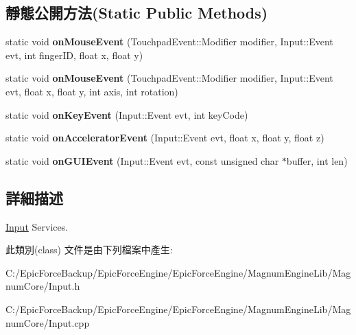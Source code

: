 \subsection*{靜態公開方法(Static Public Methods)}
\begin{DoxyCompactItemize}
\item 
static void {\bfseries on\+Mouse\+Event} (Touchpad\+Event\+::\+Modifier modifier, Input\+::\+Event evt, int finger\+ID, float x, float y)\hypertarget{class_magnum_1_1_input_a9e4984faa8e4443e49d73155830deb25}{}\label{class_magnum_1_1_input_a9e4984faa8e4443e49d73155830deb25}

\item 
static void {\bfseries on\+Mouse\+Event} (Touchpad\+Event\+::\+Modifier modifier, Input\+::\+Event evt, float x, float y, int axis, int rotation)\hypertarget{class_magnum_1_1_input_a640a6e0f9b0bf1df5f82d277516369ab}{}\label{class_magnum_1_1_input_a640a6e0f9b0bf1df5f82d277516369ab}

\item 
static void {\bfseries on\+Key\+Event} (Input\+::\+Event evt, int key\+Code)\hypertarget{class_magnum_1_1_input_a76cc21a9ef286a6d45852b76198b48d5}{}\label{class_magnum_1_1_input_a76cc21a9ef286a6d45852b76198b48d5}

\item 
static void {\bfseries on\+Accelerator\+Event} (Input\+::\+Event evt, float x, float y, float z)\hypertarget{class_magnum_1_1_input_a505f1f7de69f9f060bc32dec5f311951}{}\label{class_magnum_1_1_input_a505f1f7de69f9f060bc32dec5f311951}

\item 
static void {\bfseries on\+G\+U\+I\+Event} (Input\+::\+Event evt, const unsigned char $\ast$buffer, int len)\hypertarget{class_magnum_1_1_input_adf76ad18fb523c5527ef9cf4fba4a89b}{}\label{class_magnum_1_1_input_adf76ad18fb523c5527ef9cf4fba4a89b}

\end{DoxyCompactItemize}


\subsection{詳細描述}
\hyperlink{class_magnum_1_1_input}{Input} Services. 

此類別(class) 文件是由下列檔案中產生\+:\begin{DoxyCompactItemize}
\item 
C\+:/\+Epic\+Force\+Backup/\+Epic\+Force\+Engine/\+Epic\+Force\+Engine/\+Magnum\+Engine\+Lib/\+Magnum\+Core/Input.\+h\item 
C\+:/\+Epic\+Force\+Backup/\+Epic\+Force\+Engine/\+Epic\+Force\+Engine/\+Magnum\+Engine\+Lib/\+Magnum\+Core/Input.\+cpp\end{DoxyCompactItemize}
